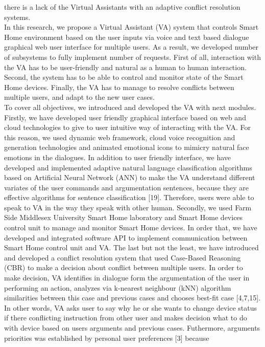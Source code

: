\documentclass{llncs}
\begin{document}
    there is a lack of the Virtual Assistants with an adaptive conflict resolution systems.\\
    In this research, we propose a Virtual Assistant (VA) system that controls Smart Home environment based on the user inputs via
    voice and text based dialogue graphical web user interface for multiple users. As a result, we developed number of
    subsystems to fully implement number of requests. First of all, interaction with the VA has to be user-friendly and
    natural as a human to human interaction. Second, the system has to be able to control and monitor state of the Smart
    Home devices. Finally, the VA has to manage to resolve conflicts between multiple users, and adapt to the new user cases.\\
    To cover all objectives, we introduced and developed the VA with next modules. Firstly, we have developed user friendly
    graphical interface based on web and cloud technologies to give to user intuitive way of interacting with the VA. For this
    reason, we used dynamic web framework, cloud voice recognition and generation technologies and animated emotional icons
    to mimicry natural face emotions in the dialogues. In addition to user friendly interface, we have developed and implemented
    adaptive natural language classification algorithms based on Artificial Neural Network (ANN) to make the VA understand
    different variates of the user commands and argumentation sentences, because they are effective algorithms for
    sentence classification [19]. Therefore, users were able to speak to
    VA in the way they speak with other human. Secondly, we used Farm Side Middlesex University Smart Home laboratory and
    Smart Home devices control unit to manage and monitor Smart Home devices. In order that, we have developed and integrated
    software API to implement communication between Smart Home control unit and VA. The last but not the least, we have
    introduced and developed a conflict resolution system that used Case-Based Reasoning (CBR) to make a decision about
    conflict between multiple users. In order to make decision, VA identifies in dialogue form the argumentation of the user
    in performing an action, analyzes via k-nearest neighbour (kNN) algorithm similarities between
    this case and previous cases and chooses best-fit case [4,7,15]. In other words, VA asks user to say why he or she wants to change
    device status if there conflicting instruction from other user and makes decision what to do with device based on users
    arguments and previous cases. Futhermore, arguments priorities was established by personal user preferences [3] because
\end{document}
